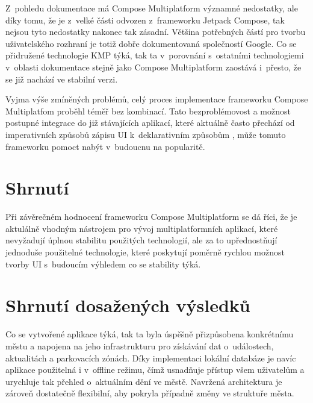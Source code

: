 

Z~pohledu dokumentace má Compose Multiplatform významné nedostatky, ale díky tomu, že je z~velké části odvozen z~frameworku Jetpack Compose,
tak nejsou tyto nedostatky nakonec tak zásadní. Většina potřebných částí pro tvorbu uživatelského rozhraní je totiž dobře dokumentovaná 
společností Google. Co se přidružené technologie KMP týká, tak ta v~porovnání s~ostatními technologiemi v~oblasti dokumentace stejně jako Compose 
Multiplatform zaostává i~přesto, že se již nachází ve stabilní verzi.

Vyjma výše zmíněných problémů, celý proces implementace frameworku Compose Multiplatfom proběhl téměř bez kombinací. Tato bezproblémovost 
a možnost postupné integrace do již stávajících aplikací, které aktuálně často přechází od imperativních způsobů zápisu UI k~deklarativním způsobům \cite{declarativeUIHistory},
může tomuto frameworku pomoct nabýt v~budoucnu na popularitě. 

\section*{Shrnutí}
Při závěrečném hodnocení frameworku Compose Multiplatform se dá říci, že je aktulálně vhodným nástrojem pro vývoj multiplatformních 
aplikací, které nevyžadují úplnou stabilitu použitých technologií, ale za to upřednostňují jednoduše použitelné technologie, které 
poskytují poměrně rychlou možnost tvorby UI s~budoucím výhledem co se stability týká.


\section{Shrnutí dosažených výsledků}
Co se vytvořené aplikace týká, tak ta byla úspěšně přizpůsobena konkrétnímu městu a napojena na jeho infrastrukturu pro získávání dat 
o~událostech, aktualitách a parkovacích zónách. Díky implementaci lokální databáze je navíc aplikace použitelná i v~offline režimu, čímž 
usnadňuje přístup všem uživatelům a urychluje tak přehled o~aktuálním dění ve městě. Navržená architektura je zároveň dostatečně flexibilní, 
aby pokryla případně změny ve struktuře města.

